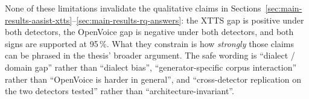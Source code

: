 None of these limitations invalidate the qualitative claims in
Sections~\ref{sec:main-results-aasist-xtts}--\ref{sec:main-results-rq-answers}:
the XTTS gap is positive under both detectors, the OpenVoice gap
is negative under both detectors, and both signs are supported at
95\,\%. What they constrain is how \emph{strongly} those claims can
be phrased in the thesis' broader argument. The safe wording is
``dialect / domain gap'' rather than ``dialect bias'',
``generator-specific corpus interaction'' rather than ``OpenVoice
is harder in general'', and ``cross-detector replication on the two
detectors tested'' rather than ``architecture-invariant''.
